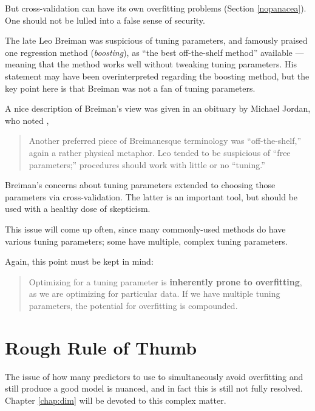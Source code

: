 But cross-validation can have its own overfitting problems (Section
\ref{nopanacea}). One should not be lulled into a false sense of
security.

The late Leo Breiman was suspicious of tuning parameters, and famously
praised one regression method ({\it boosting}), as ``the best
off-the-shelf method'' available --- meaning that the method works well
without tweaking tuning parameters.  His statement may have been
overinterpreted regarding the boosting method, but the key point here is
that Breiman was not a fan of tuning parameters.

A nice description of Breiman's view was given in an obituary by Michael
Jordan, who noted \cite{jordan2010}, 

\begin{quote}

Another preferred piece of Breimanesque terminology was
``off-the-shelf,'' again a rather physical metaphor. Leo tended to be
suspicious of ``free parameters;'' procedures should work with little or
no ``tuning.''

\end{quote}

Breiman's concerns about tuning parameters extended to choosing those
parameters via cross-validation.  The latter is an important tool, but
should be used with a healthy dose of skepticism.

This issue will come up often, since many commonly-used methods do have
various tuning parameters; some have multiple, complex tuning
parameters.

Again, this point must be kept in mind:

\begin{quote}

Optimizing for a tuning parameter is {\bf inherently prone to
overfitting}, as we are optimizing for particular data.  If we have
multiple tuning parameters, the potential for overfitting is compounded.

\end{quote}

\section{Rough Rule of Thumb}
\label{rough}

The issue of how many predictors to use to simultaneously avoid
overfitting and still produce a good model is nuanced, and in fact this
is still not fully resolved.  Chapter \ref{chap:dim} will be devoted to
this complex matter.

